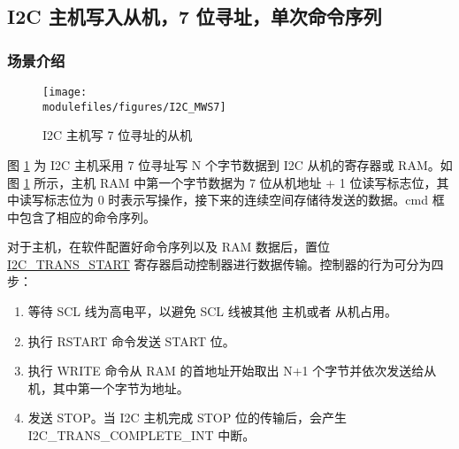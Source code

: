 \documentclass[main\_\_CN.tex]{subfiles}
\begin{document}
\subsection{I2C 主机写入从机，7 位寻址，单次命令序列}\label{subsec:i2c-mws7}
\subsubsection{场景介绍}
\begin{figure}[H]
    \centering
    \texttt{[image: \\modulefiles/figures/I2C\_MWS7]}
    \caption{I2C 主机写 7 位寻址的从机}
    \label{fig:i2c-mws7}
\end{figure}

图 \ref{fig:i2c-mws7} 为 I2C 主机采用 7 位寻址写 N 个字节数据到 I2C 从机的寄存器或 RAM。如图 \ref{fig:i2c-mws7} 所示，主机 RAM 中第一个字节数据为 7 位从机地址 + 1 位读写标志位，其中读写标志位为 0 时表示写操作，接下来的连续空间存储待发送的数据。cmd 框中包含了相应的命令序列。

对于主机，在软件配置好命令序列以及 RAM 数据后，置位 \hyperref[fielddesc:I2CTRANSSTART]{I2C\_TRANS\_START} 寄存器启动控制器进行数据传输。控制器的行为可分为四步：
\begin{enumerate}
    \item 等待 SCL 线为高电平，以避免 SCL 线被其他 主机或者 从机占用。
    \item 执行 RSTART 命令发送 START 位。
    \item 执行 WRITE 命令从 RAM 的首地址开始取出 N+1 个字节并依次发送给从机，其中第一个字节为地址。
    \item 发送 STOP。当 I2C 主机完成 STOP 位的传输后，会产生 I2C\_TRANS\_COMPLETE\_INT 中断。
\end{enumerate}
\end{document}

